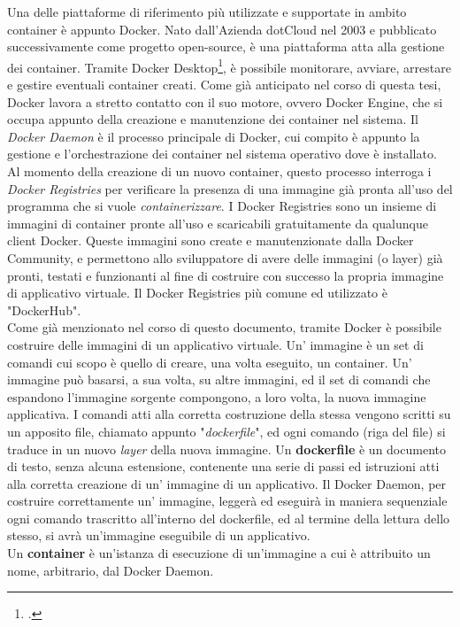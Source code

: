 Una delle piattaforme di riferimento più utilizzate e supportate in ambito container è appunto Docker. Nato dall'Azienda dotCloud nel 2003 e pubblicato successivamente come progetto open-source, è una piattaforma atta alla gestione dei container. Tramite Docker Desktop\footcite{presente solamente per le versioni Windows}, è possibile monitorare, avviare, arrestare e gestire eventuali container creati. Come già anticipato nel corso di questa tesi, Docker lavora a stretto contatto con il suo motore, ovvero Docker Engine, che si occupa appunto della creazione e manutenzione dei container nel sistema.
Il \textit{Docker Daemon} è il processo principale di Docker, cui compito è appunto la gestione e l'orchestrazione dei container nel sistema operativo dove è installato. Al momento della creazione di un nuovo container, questo processo interroga i \textit{Docker Registries} per verificare la presenza di una immagine già pronta all'uso del programma che si vuole \textit{containerizzare}. I Docker Registries sono un insieme di immagini di container pronte all'uso e scaricabili gratuitamente da qualunque client Docker. Queste immagini sono create e manutenzionate dalla Docker Community, e permettono allo sviluppatore di avere delle immagini (o layer) già pronti, testati e funzionanti al fine di costruire con successo la propria immagine di applicativo virtuale. Il Docker Registries più comune ed utilizzato è "DockerHub".\\
Come già menzionato nel corso di questo documento, tramite Docker è possibile costruire delle immagini di un applicativo virtuale. Un' immagine è un set di comandi cui scopo è quello di creare, una volta eseguito, un container. Un' immagine può basarsi, a sua volta, su altre immagini, ed il set di comandi che espandono l'immagine sorgente compongono, a loro volta, la nuova immagine applicativa. I comandi atti alla corretta costruzione della stessa vengono scritti su un apposito file, chiamato appunto "\textit{dockerfile}", ed ogni comando (riga del file) si traduce in un nuovo \textit{layer} della nuova immagine. Un \textbf{dockerfile} è un documento di testo, senza alcuna estensione, contenente una serie di passi ed istruzioni atti alla corretta creazione di un' immagine di un applicativo. Il Docker Daemon, per costruire correttamente un' immagine, leggerà ed eseguirà in maniera sequenziale ogni comando trascritto all'interno del dockerfile, ed al termine della lettura dello stesso, si avrà un'immagine eseguibile di un applicativo. \\
Un \textbf{container} è un'istanza di esecuzione di un'immagine a cui è attribuito un nome, arbitrario, dal Docker Daemon. 

